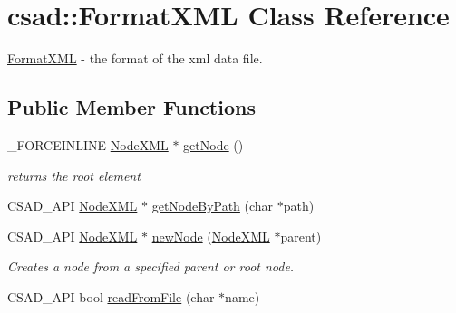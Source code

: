\hypertarget{classcsad_1_1_format_x_m_l}{\section{csad\-:\-:Format\-X\-M\-L Class Reference}
\label{classcsad_1_1_format_x_m_l}
}


\hyperlink{classcsad_1_1_format_x_m_l}{Format\-X\-M\-L} -\/ the format of the xml data file.  


\subsection*{Public Member Functions}
\begin{DoxyCompactItemize}
\item 
\hypertarget{classcsad_1_1_format_x_m_l_a1aa09f102b7ea207089af1f678eb8122}{\-\_\-\-F\-O\-R\-C\-E\-I\-N\-L\-I\-N\-E \hyperlink{classcsad_1_1_node_x_m_l}{Node\-X\-M\-L} $\ast$ \hyperlink{classcsad_1_1_format_x_m_l_a1aa09f102b7ea207089af1f678eb8122}{get\-Node} ()}\label{classcsad_1_1_format_x_m_l_a1aa09f102b7ea207089af1f678eb8122}

\begin{DoxyCompactList}\small\item\em returns the root element \end{DoxyCompactList}\item 
C\-S\-A\-D\-\_\-\-A\-P\-I \hyperlink{classcsad_1_1_node_x_m_l}{Node\-X\-M\-L} $\ast$ \hyperlink{classcsad_1_1_format_x_m_l_a9899ec63a8c33281011f711f0b0ce6ff}{get\-Node\-By\-Path} (char $\ast$path)
\item 
\hypertarget{classcsad_1_1_format_x_m_l_a3356445cf390e438136a51d8cf47b6f2}{C\-S\-A\-D\-\_\-\-A\-P\-I \hyperlink{classcsad_1_1_node_x_m_l}{Node\-X\-M\-L} $\ast$ \hyperlink{classcsad_1_1_format_x_m_l_a3356445cf390e438136a51d8cf47b6f2}{new\-Node} (\hyperlink{classcsad_1_1_node_x_m_l}{Node\-X\-M\-L} $\ast$parent)}\label{classcsad_1_1_format_x_m_l_a3356445cf390e438136a51d8cf47b6f2}

\begin{DoxyCompactList}\small\item\em Creates a node from a specified parent or root node. \end{DoxyCompactList}\item 
\hypertarget{classcsad_1_1_format_x_m_l_a22e3a24dc005675c38ea237114bc0538}{C\-S\-A\-D\-\_\-\-A\-P\-I bool \hyperlink{classcsad_1_1_format_x_m_l_a22e3a24dc005675c38ea237114bc0538}{read\-From\-File} (char $\ast$name)}\label{classcsad_1_1_format_x_m_l_a22e3a24dc005675c38ea237114bc0538}


\end{DoxyCompactItemize}
